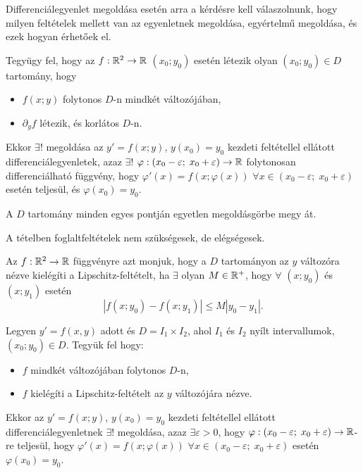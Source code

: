 \begin{note}
  Differenciálegyenlet megoldása esetén arra a kérdésre kell válaszolnunk, hogy
  milyen feltételek mellett van az egyenletnek megoldása, egyértelmű megoldása,
  és ezek hogyan érhetőek el.
\end{note}

\begin{definition}
  Tegyügy fel, hogy az $f: \mathbb{R}^2 \rightarrow \mathbb{R}$
  $\left( x_0 ; y_0 \right)$ esetén létezik olyan
  $\left( x_0 ; y_0 \right) \in D$ tartomány, hogy
  \begin{itemize}
    \item $f(x; y)$ folytonos $D$-n mindkét változójában,
    \item $\partial_y f$ létezik, és korlátos $D$-n.
  \end{itemize}
  Ekkor $\exists!$ megoldása az $y' = f(x; y)$, $y(x_0) = y_0$
  kezdeti feltétellel ellátott differenciálegyenletek, azaz
  $\exists!$ $\varphi :
    \left( x_0 - \varepsilon; \; x_0 + \varepsilon \right)
    \rightarrow \mathbb{R}$ folytonosan differenciálható függvény,
  hogy $\varphi' (x) = f \left(x ; \varphi(x)\right)$
  $\forall x \in \left( x_0 - \varepsilon; \; x_0 + \varepsilon \right)$
  esetén teljesül, és $\varphi(x_0) = y_0$.
\end{definition}

\begin{note}
  A $D$ tartomány minden egyes pontján egyetlen megoldásgörbe megy át.

  A tételben foglaltfeltételek nem szükségesek, de elégségesek.
\end{note}

\begin{definition}
  Az $f : \mathbb{R}^2 \rightarrow \mathbb{R}$ függvényre azt monjuk,
  hogy  a $D$ tartományon az $y$ változóra nézve kielégíti a
  Lipschitz-feltételt, ha $\exists$ olyan $M \in \mathbb{R}^+$, hogy
  $\forall$ $\left( x; y_0 \right)$ és $\left( x; y_1 \right)$ esetén
  $$
    \left| f(x; y_0) - f(x; y_1) \right| \leq M \left| y_0 - y_1 \right|.
  $$
\end{definition}

\begin{theorem}
  Legyen $y' = f(x, y)$ adott és $D = I_1 \times I_2$, ahol $I_1$ és $I_2$ nyílt
  intervallumok, $\left( x_0 ; y_0 \right) \in D$. Tegyük fel hogy:
  \begin{itemize}
    \item $f$ mindkét változójában folytonos $D$-n,
    \item $f$ kielégíti a Lipschitz-feltételt az $y$
          változójára nézve.
  \end{itemize}
  Ekkor az $y' = f(x; y)$, $y(x_0) = y_0$ kezdeti feltétellel
  ellátott differenciálegyenletnek $\exists!$ megoldása, azaz
  $\exists \varepsilon > 0$, hogy $\varphi :
    \left( x_0 - \varepsilon; \; x_0 + \varepsilon \right)
    \rightarrow \mathbb{R}$-re teljesül, hogy $\varphi' (x)
    = f \left(x ; \varphi(x)\right)$
  $\forall x \in \left( x_0 - \varepsilon; \; x_0 + \varepsilon \right)$
  esetén $\varphi(x_0) = y_0$.
\end{theorem}

